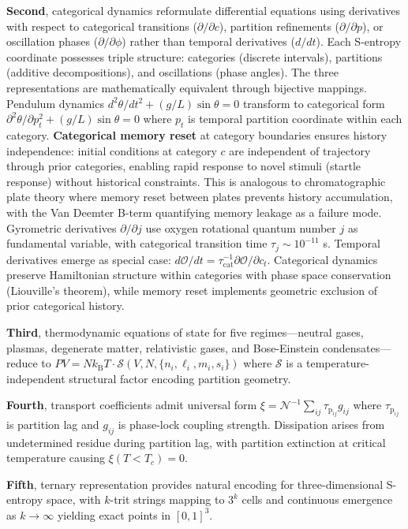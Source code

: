 \documentclass[12pt,a4paper]{article}
\theoremstyle{plain}
\theoremstyle{definition}
\theoremstyle{remark}
\newcommand{\kB}{k_{\mathrm{B}}}
\newcommand{\taulag}{\tau_{\mathrm{p}}}
\begin{document}
\textbf{Second}, categorical dynamics reformulate differential equations using derivatives with respect to categorical transitions ($\partial/\partial c$), partition refinements ($\partial/\partial p$), or oscillation phases ($\partial/\partial \phi$) rather than temporal derivatives ($d/dt$). Each S-entropy coordinate possesses triple structure: categories (discrete intervals), partitions (additive decompositions), and oscillations (phase angles). The three representations are mathematically equivalent through bijective mappings. Pendulum dynamics $d^2\theta/dt^2 + (g/L)\sin\theta = 0$ transform to categorical form $\partial^2\theta/\partial p_t^2 + (g/L)\sin\theta = 0$ where $p_t$ is temporal partition coordinate within each category. \textbf{Categorical memory reset} at category boundaries ensures history independence: initial conditions at category $c$ are independent of trajectory through prior categories, enabling rapid response to novel stimuli (startle response) without historical constraints. This is analogous to chromatographic plate theory where memory reset between plates prevents history accumulation, with the Van Deemter B-term quantifying memory leakage as a failure mode. Gyrometric derivatives $\partial/\partial j$ use oxygen rotational quantum number $j$ as fundamental variable, with categorical transition time $\tau_j \sim 10^{-11}$ s. Temporal derivatives emerge as special case: $d\mathcal{O}/dt = \tau_{\text{cat}}^{-1} \partial \mathcal{O}/\partial c_t$. Categorical dynamics preserve Hamiltonian structure within categories with phase space conservation (Liouville's theorem), while memory reset implements geometric exclusion of prior categorical history.

\textbf{Third}, thermodynamic equations of state for five regimes—neutral gases, plasmas, degenerate matter, relativistic gases, and Bose-Einstein condensates—reduce to $PV = N\kB T \cdot \mathcal{S}(V,N,\{n_i,\ell_i,m_i,s_i\})$ where $\mathcal{S}$ is a temperature-independent structural factor encoding partition geometry.

\textbf{Fourth}, transport coefficients admit universal form $\xi = \mathcal{N}^{-1} \sum_{ij} \taulag_{ij} g_{ij}$ where $\taulag_{ij}$ is partition lag and $g_{ij}$ is phase-lock coupling strength. Dissipation arises from undetermined residue during partition lag, with partition extinction at critical temperature causing $\xi(T < T_c) = 0$.

\textbf{Fifth}, ternary representation provides natural encoding for three-dimensional S-entropy space, with $k$-trit strings mapping to $3^k$ cells and continuous emergence as $k \to \infty$ yielding exact points in $[0,1]^3$.
\end{document}
